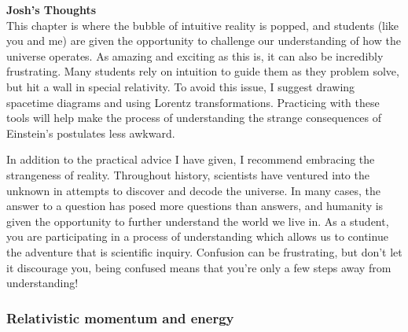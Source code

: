 \begin{framed}
\textbf{Josh's Thoughts}\\
This chapter is where the bubble of intuitive reality is popped, and students (like you and me) are given the opportunity to challenge our understanding of how the universe operates. As amazing and exciting as this is, it can also be incredibly frustrating. Many students rely on intuition to guide them as they problem solve, but hit a wall in special relativity. To avoid this issue, I suggest drawing spacetime diagrams and using Lorentz transformations. Practicing with these tools will help make the process of understanding the strange consequences of Einstein's postulates less awkward.

In addition to the practical advice I have given, I recommend embracing the strangeness of reality. Throughout history, scientists have ventured into the unknown in attempts to discover and decode the universe. In many cases, the answer to a question has posed more questions than answers, and humanity is given the opportunity to further understand the world we live in. As a student, you are participating in a process of understanding which allows us to continue the adventure that is scientific inquiry. Confusion can be frustrating, but don't let it discourage you, being confused means that you're only a few steps away from understanding!
\end{framed}

\subsubsection{Relativistic momentum and energy}


